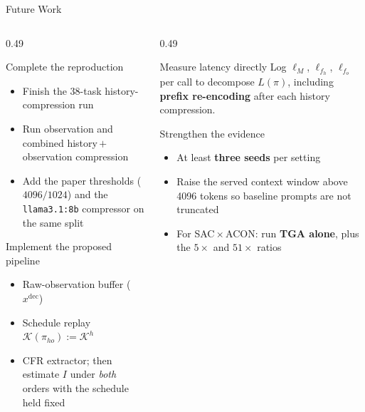 \documentclass[usenames,dvipsnames,aspectratio=169,10pt]{beamer}
\begin{document}
\begin{frame}{Future Work}
\begin{columns}[T]
\begin{column}{0.49\textwidth}
\begin{block}{Complete the reproduction}
\footnotesize
\begin{itemize}
  \item Finish the 38-task history-compression run
  \item Run observation and combined history\,$+$\,observation compression
  \item Add the paper thresholds ($4096/1024$) and the
        \texttt{llama3.1:8b} compressor on the same split
\end{itemize}
\end{block}
\begin{block}{Implement the proposed pipeline}
\footnotesize
\begin{itemize}
  \item Raw-observation buffer ($x^{\mathrm{dec}}$)
  \item Schedule replay $\mathcal{K}(\pi_{ho}):=\mathcal{K}^{h}$
  \item CFR extractor; then estimate $I$ under \emph{both} orders with the
        schedule held fixed
\end{itemize}
\end{block}
\end{column}
\begin{column}{0.49\textwidth}
\begin{block}{Measure latency directly}
\footnotesize
Log $\ell_M$, $\ell_{f_h}$, $\ell_{f_o}$ per call to decompose $L(\pi)$,
including \textbf{prefix re-encoding} after each history compression.
\end{block}
\begin{alertblock}{Strengthen the evidence}
\footnotesize
\begin{itemize}
  \item At least \textbf{three seeds} per setting
  \item Raise the served context window above 4096 tokens so baseline prompts
        are not truncated
  \item For SAC\,$\times$\,ACON: run \textbf{TGA alone}, plus the $5\times$ and
        $51\times$ ratios
\end{itemize}
\end{alertblock}
\end{column}
\end{columns}
\end{frame}
\end{document}
